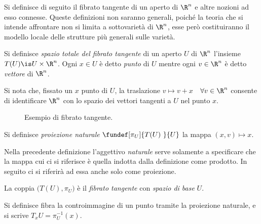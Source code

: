 



Si definisce di seguito il fibrato tangente di un aperto di $\R ^n$
e altre nozioni ad esso connesse.
Queste definizioni non saranno generali,
poiché la teoria che si intende affrontare non si limita a sottovarietà di $\R^ n$,
esse però costituiranno il modello locale delle strutture più generali sulle varietà.

\begin{defn}
	Si definisce \emph{spazio totale del fibrato tangente} di un aperto $U$ di $\R^ n$
	l'insieme $T(U) \is U \times \R^ n$.
	Ogni $x\in U$ è detto \emph{punto} di $U$
	mentre ogni $v\in \R^ n$ è detto \emph{vettore} di $\R ^n$.
\end{defn}

Si nota che, fissato un $x$ punto di $U$, la traslazione
$v \mapsto v + x$~~$\forall v\in \R^ n$
consente di identificare $\R ^n$
con lo spazio dei vettori tangenti a $U$ nel punto $x$.

\begin{figure}
	\centering
	
	\caption{Esempio di fibrato tangente.}
\end{figure}

\begin{defn}
	Si definisce \emph{proiezione naturale}
	$\fundef[\pi _U]{T(U)~}{U}$
	la mappa $(x,v) \mapsto x$.
\end{defn}

Nella precedente definizione
l'aggettivo \emph{naturale} serve solamente a specificare
che la mappa cui ci si riferisce è quella indotta dalla definizione come prodotto.
In seguito ci si riferirà ad essa anche solo come proiezione.

\begin{defn}
	La coppia $\big(T(U),\pi_U\big)$ è il \emph{fibrato tangente} con \emph{spazio di base} $U$.
\end{defn}

\begin{defn}[Fibra]
	Si definisce fibra la controimmagine di un punto tramite la proiezione naturale,
	e si scrive $T_x U = \pi ^{-1} _U (x)$.
\end{defn}

